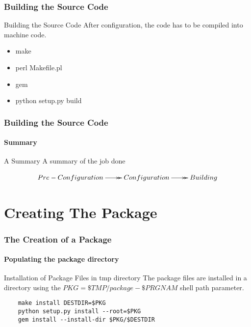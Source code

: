 \documentclass[1pt,hyperref={pdfpagelabels=true}]{beamer}
\begin{document}
\begin{frame}
  \frametitle{Building the Source Code}
  
  \begin{block}{Building the Source Code}
    After configuration, the code has to be compiled into machine code.
  \end{block}
  
  \pause
  
  \begin{example}
    \begin{itemize}[<+-| alert@+>]
    \item make
    \item perl Makefile.pl
    \item gem
    \item python setup.py build
    \end{itemize}
  \end{example}
  
\end{frame}

\begin{frame}
  \frametitle{Building the Source Code}
  \framesubtitle{Summary}
  
  \begin{block}{A Summary}
    A summary of the job done
  \end{block}
  \begin{equation*}
    \xymatrix@C=2pc@R=2pc{
      Pre-Configuration\ar@{->>}[r] & Configuration\ar@{->>}[r] & Building}
  \end{equation*}
  
\end{frame}

\section{Creating The Package}

\begin{frame}[fragile]
  \frametitle{The Creation of a Package}
  \framesubtitle{Populating the package directory}
  
  \begin{block}{Installation of Package Files in tmp directory}
    The package files are installed in a directory using the
    $PKG=\$TMP/package-\$PRGNAM$ shell path parameter.
  \end{block}
  
  \pause
  
  \begin{lstlisting}
    make install DESTDIR=$PKG
    python setup.py install --root=$PKG
    gem install --install-dir $PKG/$DESTDIR
  \end{lstlisting}
  
\end{frame}
\end{document}
